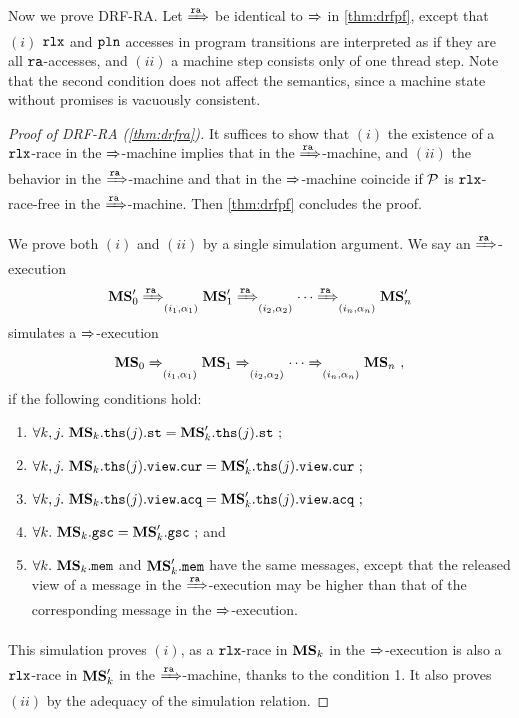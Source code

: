 Now we prove DRF-RA.
Let $\xRightarrow{\texttt{ra}}$ be identical to $\xRightarrow{}$ in \cref{thm:drfpf}, except that
$(i)$ $\texttt{rlx}$ and $\texttt{pln}$ accesses in program transitions are interpreted as if they are all $\texttt{ra}$-accesses, and
$(ii)$ a machine step consists only of one thread step.
Note that the second condition does not affect the semantics, since a machine state without promises is vacuously consistent.

\begin{proof}[Proof of DRF-RA (\cref{thm:drfra})]
  It suffices to show that $(i)$ the existence of a $\texttt{rlx}$-race in the
  $\xRightarrow{}$-machine implies that in the $\xRightarrow{\texttt{ra}}$-machine, and
  $(ii)$ the behavior in the $\xRightarrow{\texttt{ra}}$-machine and that in the
  $\xRightarrow{}$-machine coincide if $\mathcal{P}$ is $\texttt{rlx}$-race-free in the
  $\xRightarrow{\texttt{ra}}$-machine.  Then \cref{thm:drfpf} concludes the proof.

  We prove both $(i)$ and $(ii)$ by a single simulation argument.  We
  say an $\xRightarrow{\texttt{ra}}$-execution
\[{\mathbf{MS}}'_0 \xRightarrow{\texttt{ra}}_{(i_1,\alpha_1)} {\mathbf{MS}}'_1 \xRightarrow{\texttt{ra}}_{(i_2,\alpha_2)}
\cdots \xRightarrow{\texttt{ra}}_{(i_n,\alpha_n)} {\mathbf{MS}}'_n \]
simulates a $\xRightarrow{}$-execution
\[{\mathbf{MS}}_0 \xRightarrow{}_{(i_1,\alpha_1)} {\mathbf{MS}}_1 \xRightarrow{}_{(i_2,\alpha_2)}
\cdots \xRightarrow{}_{(i_n,\alpha_n)} {\mathbf{MS}}_n ~,\]
if the following conditions hold:
\begin{enumerate}
\item $\forall k, j.~{\mathbf{MS}}_k.\mathtt{ths}(j).\texttt{st} = {\mathbf{MS}}'_k.\mathtt{ths}(j).\texttt{st}~;$
\item $\forall k, j.~{\mathbf{MS}}_k.\mathtt{ths}(j).\texttt{view}.{\texttt{cur}} = {\mathbf{MS}}'_k.\mathtt{ths}(j).\texttt{view}.{\texttt{cur}}~;$
\item $\forall k, j.~{\mathbf{MS}}_k.\mathtt{ths}(j).\texttt{view}.{\texttt{acq}} = {\mathbf{MS}}'_k.\mathtt{ths}(j).\texttt{view}.{\texttt{acq}}~;$
\item $\forall k.~{\mathbf{MS}}_k.\mathtt{gsc} = {\mathbf{MS}}'_k.\mathtt{gsc}~;$ and
\item $\forall k.~{\mathbf{MS}}_k.\mathtt{mem}$ and ${\mathbf{MS}}'_k.\mathtt{mem}$ have the
  same messages, except that the released view of a message in the
  $\xRightarrow{\texttt{ra}}$-execution may be higher than that of the corresponding
  message in the $\xRightarrow{}$-execution.
\end{enumerate}
This simulation proves $(i)$, as a $\texttt{rlx}$-race in ${\mathbf{MS}}_k$ in the
$\xRightarrow{}$-execution is also a $\texttt{rlx}$-race in ${\mathbf{MS}}'_k$ in the
$\xRightarrow{\texttt{ra}}$-machine, thanks to the condition 1.  It also proves
$(ii)$ by the adequacy of the simulation relation.


\end{proof}

